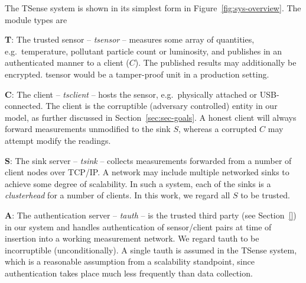 The TSense system is shown in its simplest form in Figure~\ref{fig:sys-overview}. The module types are
%
\begin{description}

\item \textbf{T}: The trusted sensor -- \textit{tsensor} -- measures some array of quantities, e.g.\ temperature, pollutant particle count or luminosity, and publishes in an authenticated manner to a client ($C$). The published results may additionally be encrypted. tsensor would be a tamper-proof unit in a production setting.

\item \textbf{C}: The client -- \textit{tsclient} -- hosts the sensor, e.g.\ physically attached or USB-connected. The client is the corruptible (adversary controlled) entity in our model, as further discussed in Section~\ref{sec:sec-goals}. A honest client will always forward measurements unmodified to the sink $S$, whereas a corrupted $C$ may attempt modify the readings.

\item \textbf{S}: The sink server -- \textit{tsink} -- collects measurements forwarded from a number of client nodes over TCP/IP. A network may include multiple networked sinks to achieve some degree of scalability. In such a system, each of the sinks is a \textit{clusterhead} for a number of clients. In this work, we regard all $S$ to be trusted. %

\item \textbf{A}: The authentication server -- \textit{tauth} -- is the trusted third party (see Section~\ref{}) in our system and handles authentication of sensor/client pairs at time of insertion into a working measurement network. 
We regard tauth to be incorruptible (unconditionally). A single tauth is assumed in the TSense system, which is a reasonable assumption from a scalability standpoint, since authentication takes place much less frequently than data collection.

\end{description}

